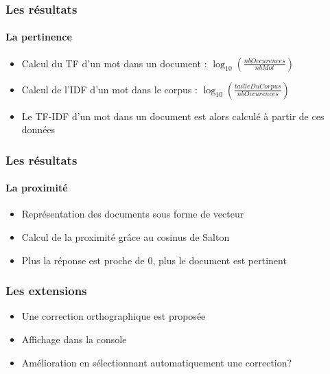 \documentclass{beamer}
\begin{document}
\begin{frame}

\frametitle{Les r\'esultats}
\framesubtitle{La pertinence}

\begin{itemize}
 \item Calcul du TF d'un mot dans un document : $ \log_{10}(\frac{nbOccurences}{nbMot}) $
 \item Calcul de l'IDF d'un mot dans le corpus : $ \log_{10}(\frac{tailleDuCorpus}{nbOccurences}) $
 \item Le TF-IDF d'un mot dans un document est alors calcul\'e \`a partir de ces donn\'ees
\end{itemize}

 
\end{frame}

\begin{frame}

\frametitle{Les r\'esultats}
\framesubtitle{La proximit\'e}

\begin{itemize}
 \item Repr\'esentation des documents sous forme de vecteur
 \item Calcul de la proximit\'e gr\^ace au cosinus de Salton
 \item Plus la r\'eponse est proche de 0, plus le document est pertinent
\end{itemize}

 
\end{frame}

\begin{frame}

\frametitle{Les extensions}

\begin{itemize}
 \item Une correction orthographique est propos\'ee
 \item Affichage dans la console
 \item Am\'elioration en s\'electionnant automatiquement une correction?
\end{itemize}

 
\end{frame}
\end{document}

